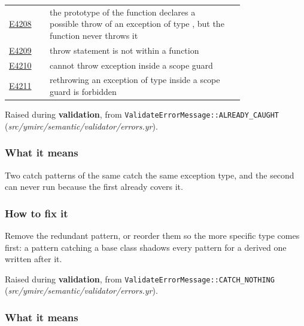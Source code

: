 \begin{longtable}{@{}l p{0.78\linewidth} r@{}}
\hyperref[sec:codes:e4208]{E4208} & the prototype of the function \errhole{} declares a possible throw of an exception of type \errhole{}, but the function never throws it & \pageref{sec:codes:e4208}\\
\hyperref[sec:codes:e4209]{E4209} & throw statement is not within a function & \pageref{sec:codes:e4209}\\
\hyperref[sec:codes:e4210]{E4210} & cannot throw exception inside a scope guard & \pageref{sec:codes:e4210}\\
\hyperref[sec:codes:e4211]{E4211} & rethrowing an exception of type \errhole{} inside a scope guard is forbidden & \pageref{sec:codes:e4211}\\
\bottomrule
\end{longtable}

\label{sec:codes:e4003}

Raised during \textbf{validation}, from \texttt{ValidateErrorMessage::\allowbreak{}ALREADY\_\allowbreak{}CAUGHT} (\textit{src/\allowbreak{}ymirc/\allowbreak{}semantic/\allowbreak{}validator/\allowbreak{}errors.yr}).

\subsubsection*{What it means}

Two catch patterns of the same  catch the same exception type, and the second can never run because the first already covers it.

\subsubsection*{How to fix it}

Remove the redundant pattern, or reorder them so the more specific type comes first: a pattern catching a base class shadows every pattern for a derived one written after it.

\label{sec:codes:e4012}

Raised during \textbf{validation}, from \texttt{ValidateErrorMessage::\allowbreak{}CATCH\_\allowbreak{}NOTHING} (\textit{src/\allowbreak{}ymirc/\allowbreak{}semantic/\allowbreak{}validator/\allowbreak{}errors.yr}).

\subsubsection*{What it means}

